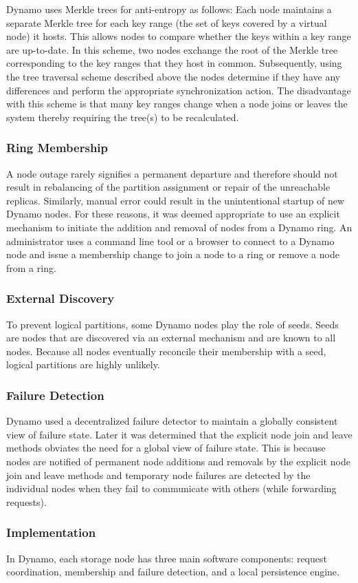 Dynamo uses Merkle trees for anti-entropy as follows: Each node
maintains a separate Merkle tree for each key range (the set of
keys covered by a virtual node) it hosts. This allows nodes to
compare whether the keys within a key range are up-to-date. In
this scheme, two nodes exchange the root of the Merkle tree
corresponding to the key ranges that they host in common.
Subsequently, using the tree traversal scheme described above the
nodes determine if they have any differences and perform the
appropriate synchronization action. The disadvantage with this
scheme is that many key ranges change when a node joins or
leaves the system thereby requiring the tree(s) to be recalculated. 

\subsubsection{Ring Membership}
A node outage rarely signifies a permanent departure
and therefore should not result in rebalancing of the partition
assignment or repair of the unreachable replicas. Similarly,
manual error could result in the unintentional startup of new
Dynamo nodes. For these reasons, it was deemed appropriate to
use an explicit mechanism to initiate the addition and removal of
nodes from a Dynamo ring. An administrator uses a command
line tool or a browser to connect to a Dynamo node and issue a
membership change to join a node to a ring or remove a node
from a ring. 

\subsubsection{External Discovery}

To prevent logical
partitions, some Dynamo nodes play the role of seeds. Seeds are
nodes that are discovered via an external mechanism and are
known to all nodes. Because all nodes eventually reconcile their
membership with a seed, logical partitions are highly unlikely. 

\subsubsection{Failure Detection}

Dynamo used a decentralized failure detector to maintain a
globally consistent view of failure state. Later it was determined
that the explicit node join and leave methods obviates the need for
a global view of failure state. This is because nodes are notified of
permanent node additions and removals by the explicit node join
and leave methods and temporary node failures are detected by
the individual nodes when they fail to communicate with others
(while forwarding requests). 

\subsubsection{Implementation}
In Dynamo, each storage node has three main software
components: request coordination, membership and failure
detection, and a local persistence engine.

